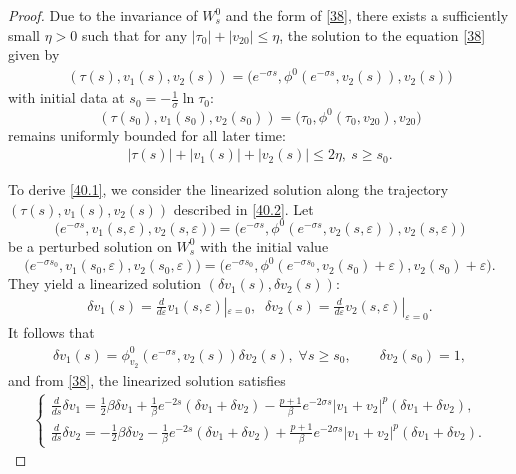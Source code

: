 \documentclass[12pt]{amsart}
\newcommand{\eps}{\varepsilon}
\begin{document}
\begin{proof}
Due to the invariance of $W_s^0$ and the form of \eqref{38}, there exists a sufficiently small $\eta>0$ such that for any $|\tau_0|+|v_{20}|\le \eta$, the solution to the equation \eqref{38} given by
\begin{align}\label{40.2}
(\tau(s), v_1(s), v_2(s))=\bigl(e^{-\sigma s}, \phi^0(e^{-\sigma s}, v_2(s)), v_2(s)\bigr)
\end{align}
with initial data at $s_0=-\frac 1\sigma \ln \tau_0$:
\[
(\tau(s_0), v_1(s_0), v_2(s_0))=\bigl(\tau_0, \phi^0(\tau_0, v_{20}), v_{20}\bigr)
\]
remains uniformly bounded for all later time:
\begin{align}\label{40.3}
|\tau(s)|+|v_1(s)|+|v_2(s)|\le 2\eta, \ s\ge s_0. 
\end{align}

To derive \eqref{40.1}, we consider the linearized solution along the trajectory $(\tau(s), v_1(s), v_2(s))$ described in \eqref{40.2}. Let 
\[\bigl(e^{-\sigma s}, v_1(s,\eps), v_2(s, \eps)\bigr)=\bigl(e^{-\sigma s}, \phi^0(e^{-\sigma s}, v_2(s,\eps)), v_2(s, \eps)\bigr)\]
be a perturbed solution on $W^0_s$ with the initial value 
\[\bigl(e^{-\sigma s_0}, v_1(s_0,\eps), v_2(s_0, \eps)\bigr)=\bigl(e^{-\sigma s_0}, \phi^0(e^{-\sigma s_0}, v_2(s_0)+\eps), v_2(s_0)+ \eps\bigr).\]
They yield a linearized solution $(\delta v_1(s), \delta v_2(s))$:
\begin{align}\label{43}
\delta v_1(s)=\tfrac{d}{d\eps}v_1(s,\eps)|_{\eps=0}, \;\; \delta v_2(s)=\tfrac{d}{d\eps}v_2(s,\eps)|_{\eps=0}. 
\end{align}
It follows that
\begin{align}\label{44}
\delta v_1(s)=\phi_{v_2}^0(e^{-\sigma s}, v_2(s))\delta v_2(s), \; \forall s\ge s_0, \qquad 
\delta v_2(s_0)=1,
\end{align}
and from \eqref{38}, the linearized solution satisfies
\begin{align}\label{45}
\begin{cases}
\tfrac d{ds}\delta v_1=\tfrac 12\beta \delta v_1+\tfrac 1\beta e^{-2s}(\delta v_1+\delta v_2)-\tfrac {p+1}\beta e^{-2\sigma s}|v_1+v_2|^p (\delta v_1+\delta v_2),\\
\tfrac d{ds}\delta v_2=-\tfrac 12\beta \delta v_2-\tfrac 1\beta e^{-2s}(\delta v_1+\delta v_2)+\tfrac {p+1}\beta e^{-2\sigma s}|v_1+v_2|^p (\delta v_1+\delta v_2).
\end{cases}
\end{align}

\end{proof}
\end{document}
